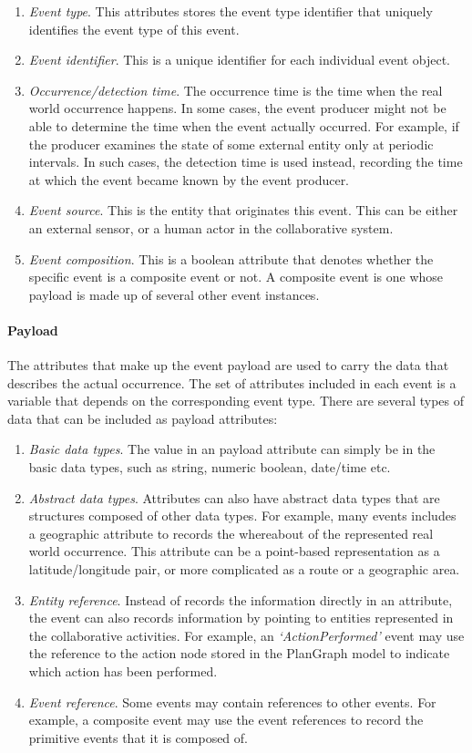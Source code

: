 \begin{enumerate}
	\item \emph{Event type}. This attributes stores the event type identifier that uniquely identifies the event type of this event.
	\item \emph{Event identifier}. This is a unique identifier for each individual event object.
	\item \emph{Occurrence/detection time}. The occurrence time is the time when the real world occurrence happens. In some cases, the event producer might not be able to determine the time when the event actually occurred. For example, if the producer examines the state of some external entity only at periodic intervals. In such cases, the detection time is used instead, recording the time at which the event became known by the event producer. 
	\item \emph{Event source}. This is the entity that originates this event. This can be either an external sensor, or a human actor in the collaborative system.
	\item \emph{Event composition}. This is a boolean attribute that denotes whether the specific event is a composite event or not. A composite event is one whose payload is made up of several other event instances.
\end{enumerate}

\paragraph*{Payload} %
\label{par:payload}
The attributes that make up the event payload are used to carry the data that describes the actual occurrence. The set of attributes included in each event is a variable that depends on the corresponding event type. There are several types of data that can be included as payload attributes:
\begin{enumerate}
	\item \emph{Basic data types}. The value in an payload attribute can simply be in the basic data types, such as string, numeric boolean, date/time etc.
	\item \emph{Abstract data types}. Attributes can also have abstract data types that are structures composed of other data types. For example, many events includes a geographic attribute to records the whereabout of the represented real world occurrence. This attribute can be a point-based representation as a latitude/longitude pair, or more complicated as a route or a geographic area.
	\item \emph{Entity reference}. Instead of records the information directly in an attribute, the event can also records information by pointing to entities represented in the collaborative activities. For example, an \emph{`ActionPerformed'} event may use the reference to the action node stored in the PlanGraph model to indicate which action has been performed.
	\item \emph{Event reference}. Some events may contain references to other events. For example, a composite event may use the event references to record the primitive events that it is composed of.
\end{enumerate}

